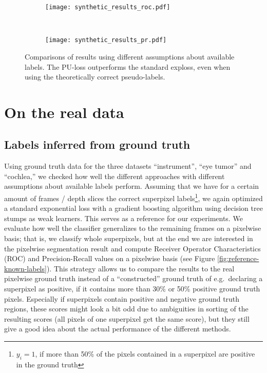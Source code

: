 \begin{figure}[ht]
	\centering
	\begin{subfigure}[h]{0.49\textwidth}
	\texttt{[image: synthetic\_results\_roc.pdf]}	
	\end{subfigure}
	~
	\begin{subfigure}[h]{0.49\textwidth}
	\texttt{[image: synthetic\_results\_pr.pdf]}	
	\end{subfigure}
	\caption{Comparisons of results using different assumptions about available labels. The PU-loss outperforms the standard exploss, even when using the theoretically correct pseudo-labels.}
	\label{fig:synthetic_results}
\end{figure}


\section{On the real data}
\subsection{Labels inferred from ground truth}
Using ground truth data for the three datasets ``instrument'', ``eye tumor'' and ``cochlea,'' we checked how well the different approaches with different assumptions about available labels perform. 
Assuming that we have for a certain amount of frames / depth slices the correct superpixel labels\footnote{$y_i = 1$, if more than 50\% of the pixels contained in a superpixel are positive in the ground truth}, we again optimized a standard exponential loss with a gradient boosting algorithm using decision tree stumps as weak learners. 
This serves as a reference for our experiments.
We evaluate how well the classifier generalizes to the remaining frames on a pixelwise basis; that is, we classify whole superpixels, but at the end we are interested in the pixelwise segmentation result and compute Receiver Operator Characteristics (ROC) and Precision-Recall values on a pixelwise basis (see Figure \ref{fig:reference-known-labels}). 
This strategy allows us to compare the results to the real pixelwise ground truth instead of a ``constructed'' ground truth of e.g.\ declaring a superpixel as positive, if it contains more than 30\% or 50\% positive ground truth pixels.
Especially if superpixels contain positive and negative ground truth regions, these scores might look a bit odd due to ambiguities in sorting of the resulting scores (all pixels of one superpixel get the same score), but they still give a good idea about the actual performance of the different methods. 


